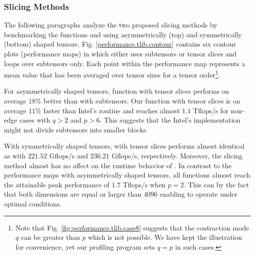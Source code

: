 

\subsubsection{Slicing Methods}
The following paragraphs analyze the two proposed slicing methods by benchmarking the functions  and  using asymmetrically (top) and symmetrically (bottom) shaped tensors.
Fig. \ref{performance.tlib.contour} contains six contour plots (performance maps) in which  either uses subtensors or tensor slices and  loops over subtensors only.
Each point within the performance map represents a mean value that has been averaged over tensor sizes for a tensor order\footnote{Note that Fig. \ref{fig:performance.tlib.case8} suggests that the contraction mode $q$ can be greater than $p$ which is not possible.
We have kept the illustration for convenience, yet our profiling program sets $q=p$ in such cases.}.

For asymmetrically shaped tensors, function  with tensor slices performs on average $18$\% better than with subtensors. %
Our function  with tensor slices is on average $11$\% faster than Intel's  routine and reaches almost $1.1$ Tflops/s for non-edge cases with $q>2$ and $p > 6$.
This suggests that the Intel's implementation might not divide subtensors into smaller blocks.

With symmetrically shaped tensors,  with tensor slices performs almost identical as  with $221.52$ Gflops/s and $236.21$ Gflops/s, respectively.
Moreover, the slicing method almost has no affect on the runtime behavior of .
In contrast to the performance maps with asymmetrically shaped tensors, all functions almost reach the attainable peak performance of $1.7$ Tflops/s when $p=2$.
This can by the fact that both dimensions are equal or larger than $4096$ enabling  to operate under optimal conditions.
\vspace{-1.5em}

